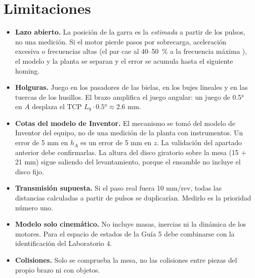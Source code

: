 \documentclass[a4paper,12pt]{article}
\begin{document}
\section{Limitaciones}
\begin{itemize}
\item \textbf{Lazo abierto.} La posición de la garra es la \emph{estimada} a partir de los pulsos, no
      una medición. Si el motor pierde pasos por sobrecarga, aceleración excesiva o frecuencias altas (el par
      cae al 40--50~\% a la frecuencia máxima \cite{manual}), el modelo y la planta se separan y el error se
      acumula hasta el siguiente homing.
\item \textbf{Holguras.} Juego en los pasadores de las bielas, en los bujes lineales y en las tuercas de los
      husillos. El brazo amplifica el juego angular: un juego de 0.5° en $A$ desplaza el TCP
      $L_9 \cdot 0.5° \approx 2.6$ mm.
\item \textbf{Cotas del modelo de Inventor.} El mecanismo se tomó del modelo de Inventor del equipo, no de una
      medición de la planta con instrumentos. Un error de 5 mm en $h_A$ es un error de 5 mm en $z$. La
      validación del apartado anterior debe confirmarlas. La altura del disco giratorio sobre la mesa (15 + 21 mm)
      sigue saliendo del levantamiento, porque el ensamble no incluye el disco fijo.
\item \textbf{Transmisión supuesta.} Si el paso real fuera 10 mm/rev, todas las distancias calculadas a
      partir de pulsos se duplicarían. Medirlo es la prioridad número uno.
\item \textbf{Modelo solo cinemático.} No incluye masas, inercias ni la dinámica de los motores. Para el
      espacio de estados de la Guía 5 debe combinarse con la identificación del Laboratorio 4.
\item \textbf{Colisiones.} Solo se comprueba la mesa, no las colisiones entre piezas del propio brazo ni
      con objetos.
\end{itemize}

\end{document}
